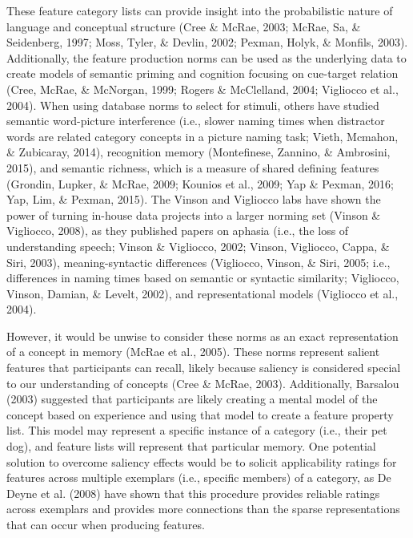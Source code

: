 \documentclass[english,,man]{apa6}
\theoremstyle{definition}
\theoremstyle{definition}
\theoremstyle{definition}
\theoremstyle{remark}
\begin{document}
These feature category lists can provide insight into the probabilistic
nature of language and conceptual structure (Cree \& McRae, 2003; McRae,
Sa, \& Seidenberg, 1997; Moss, Tyler, \& Devlin, 2002; Pexman, Holyk, \&
Monfils, 2003). Additionally, the feature production norms can be used
as the underlying data to create models of semantic priming and
cognition focusing on cue-target relation (Cree, McRae, \& McNorgan,
1999; Rogers \& McClelland, 2004; Vigliocco et al., 2004). When using
database norms to select for stimuli, others have studied semantic
word-picture interference (i.e., slower naming times when distractor
words are related category concepts in a picture naming task; Vieth,
Mcmahon, \& Zubicaray, 2014), recognition memory (Montefinese, Zannino,
\& Ambrosini, 2015), and semantic richness, which is a measure of shared
defining features (Grondin, Lupker, \& McRae, 2009; Kounios et al.,
2009; Yap \& Pexman, 2016; Yap, Lim, \& Pexman, 2015). The Vinson and
Vigliocco labs have shown the power of turning in-house data projects
into a larger norming set (Vinson \& Vigliocco, 2008), as they published
papers on aphasia (i.e., the loss of understanding speech; Vinson \&
Vigliocco, 2002; Vinson, Vigliocco, Cappa, \& Siri, 2003),
meaning-syntactic differences (Vigliocco, Vinson, \& Siri, 2005; i.e.,
differences in naming times based on semantic or syntactic similarity;
Vigliocco, Vinson, Damian, \& Levelt, 2002), and representational models
(Vigliocco et al., 2004).

However, it would be unwise to consider these norms as an exact
representation of a concept in memory (McRae et al., 2005). These norms
represent salient features that participants can recall, likely because
saliency is considered special to our understanding of concepts (Cree \&
McRae, 2003). Additionally, Barsalou (2003) suggested that participants
are likely creating a mental model of the concept based on experience
and using that model to create a feature property list. This model may
represent a specific instance of a category (i.e., their pet dog), and
feature lists will represent that particular memory. One potential
solution to overcome saliency effects would be to solicit applicability
ratings for features across multiple exemplars (i.e., specific members)
of a category, as De Deyne et al. (2008) have shown that this procedure
provides reliable ratings across exemplars and provides more connections
than the sparse representations that can occur when producing features.
\end{document}

